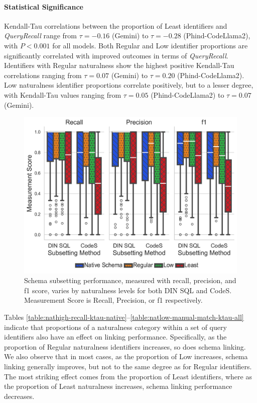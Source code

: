 \paragraph{\textbf{Statistical Significance}}
Kendall-Tau correlations between the proportion of Least identifiers and \emph{QueryRecall} range from $\tau=-0.16$ (Gemini) to $\tau=-0.28$ (Phind-CodeLlama2), with $P < 0.001$ for all models.
Both Regular and Low identifier proportions are significantly correlated with improved outcomes in terms of \emph{QueryRecall}.
Identifiers with Regular naturalness show the highest positive Kendall-Tau correlations ranging from $\tau=0.07$ (Gemini) to $\tau=0.20$ (Phind-CodeLlama2).
Low naturalness identifier proportions correlate positively, but to a lesser degree, with Kendall-Tau values ranging from $\tau=0.05$ (Phind-CodeLlama2) to $\tau=0.07$ (Gemini).

\begin{figure}
  \centering
  \includegraphics[width=\figwidthmod\linewidth]{figures/dinsql_codes_subsetting_performance.png}
  \caption{Schema subsetting performance, measured with recall, precision, and  f1 score, varies by naturalness levels for both DIN SQL and CodeS. Measurement Score is Recall, Precision, or f1 respectively.}
  \label{fig:subsettingperformance}
\end{figure}

Tables \ref{table:nathigh-recall-ktau-native}--\ref{table:natlow-manual-match-ktau-all} indicate that proportions of a naturalness category within a set of query identifiers also have an effect on linking performance.
Specifically, as the proportion of Regular naturalness identifiers increases, so does schema linking.
We also observe that in most cases, as the proportion of Low increases, schema linking generally improves, but not to the same degree as for Regular identifiers.
The most striking effect comes from the proportion of Least identifiers, where as the proportion of Least naturalness increases, schema linking performance decreases. 

